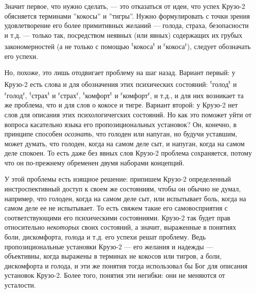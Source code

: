 \documentclass[11pt]{book}
\begin{document}
Значит первое, что нужно сделать, --- это отказаться от идеи, что успех Крузо-2 обясняется терминами ''кокосы'' и ''тигры''. Нужно формулировать с точки зрения удовлетворение его более примитивных желаний --- голода, страха, безопасности и т.д. --- только так, посредством неявных (или явных) содержащих их грубых закономерностей (а не только с помощью \textsuperscript{t}кокоса\textsuperscript{t} и \textsuperscript{r}кокоса\textsuperscript{r}), следует обозначать его успехи.

Но, похоже, это лишь отодвигает проблему на шаг назад. Вариант первый: у Крузо-2 есть слова и для обозначения этих психических состояний: \textsuperscript{t}голод\textsuperscript{t} и \textsuperscript{r}голод\textsuperscript{r}, \textsuperscript{t}страх\textsuperscript{t} и \textsuperscript{r}страх\textsuperscript{r}, \textsuperscript{t}комфорт\textsuperscript{t} и \textsuperscript{r}комфорт\textsuperscript{r}, и т.д., и для них возникает та же проблема, что и для слов о кокосе и тигре. Вариант второй: у Крузо-2 нет слов для описания этих психологичегских состояний. Но как это поможет уйти от вопроса касательно языка его пропозициональных установок? Он, конечно, в принципе способен \textit{осознать}, что голоден или напуган, но будучи уставшим, может думать, что голоден, когда на самом деле сыт, и напуган, когда на самом деле спокоен. То есть даже без явных слов Крузо-2 проблема сохраняется, потому что он по-прежнему обременен двумя наборами концепций.

У этой проблемы есть изящное решение: припишем Крузо-2 определенный инстроспективный доступ к своем же состояниям, чтобы он обычно не думал, например, что голоден, когда на самом деле сыт, или испытывает боль, когда на самом деле ее не испытывает. То есть свяжем такие его самовосприятия с соответствующими его психическими состояниями. Крузо-2 так будет прав относительно \textit{некоторых} своих состояний, а значит, выраженные в понятиях боли, дискомфорта, голода и т.д. его успехи решат проблему. Ведь пропозициональные установки Крузо-2 --- его желания и надежды --- объективны, когда выражены в терминах не кокосов или тигров, а боли, дискомфорта и голода, и эти же понятия тогда использовал бы Бог для описания установок Крузо-2. Более того, понятия эти негибки: они не меняются от усталости.
\end{document}
